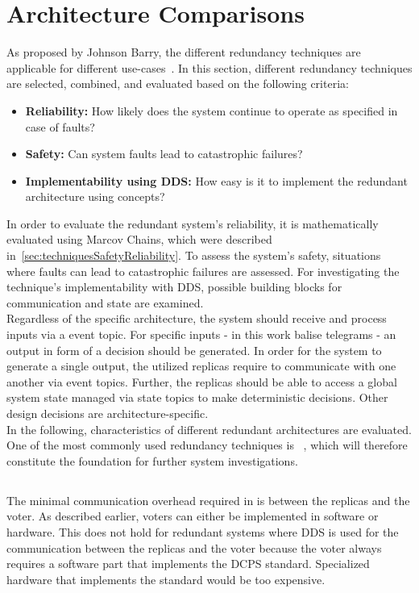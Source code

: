 \section{Architecture Comparisons}
As proposed by Johnson Barry, the different redundancy techniques are applicable for different use-cases~\cite{BarryFaultToleranceAnalysis}.
In this section, different redundancy techniques are selected, combined, and evaluated based on the following criteria:

\begin{itemize}
\item \textbf{Reliability:} How likely does the system continue to operate as specified in case of faults?
\item \textbf{Safety:} Can system faults lead to catastrophic failures?
\item \textbf{Implementability using \gls*{DDS}:} How easy is it to implement the redundant architecture using  concepts?
\end{itemize}

In order to evaluate the redundant system's reliability, it is mathematically evaluated using Marcov Chains, which were described in~\autoref{sec:techniquesSafetyReliability}.
To assess the system's safety, situations where faults can lead to catastrophic failures are assessed. 
For investigating the technique's implementability with \gls*{DDS}, possible  building blocks for communication and state are examined.
\\

Regardless of the specific architecture, the system should receive and process inputs via a  event topic.
For specific inputs - in this work balise telegrams - an output in form of a decision should be generated.
In order for the system to generate a single output, the utilized replicas require to communicate with one another via  event topics.
Further, the replicas should be able to access a global system state managed via  state topics to make deterministic decisions.
Other design decisions are architecture-specific.
\\

In the following, characteristics of different redundant architectures are evaluated.
One of the most commonly used redundancy techniques is ~\cite{FaultToleranceViaNMR}, which will therefore constitute the foundation for further system investigations.

\subsection{}
The minimal communication overhead required in  is between the replicas and the voter.
As described earlier, voters can either be implemented in software or hardware.
This does not hold for redundant systems where \gls*{DDS} is used for the communication between the replicas and the voter because the voter always requires a software part that implements the \gls*{DCPS} standard.
Specialized hardware that implements the  standard would be too expensive.
\\

